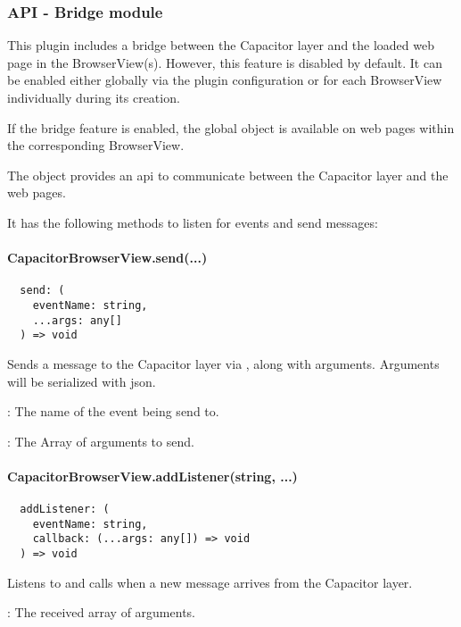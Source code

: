 \subsubsection{API - Bridge module}
\label{sec:Capacitor-BrowserView:API_BridgeModule}

This plugin includes a bridge between the Capacitor layer and the loaded web page in the BrowserView(s).
However, this feature is disabled by default.
It can be enabled either globally via the plugin configuration or for each BrowserView individually during its creation.

If the bridge feature is enabled, the global object  is available on web pages within the corresponding BrowserView.

The  object provides an \ac{api} to communicate between the Capacitor layer and the web pages.

It has the following methods to listen for events and send messages:

\begin{arguments}
  \item {}
  \item {}
\end{arguments}


\paragraph{CapacitorBrowserView.send(...)}

\begin{verbatim}
  send: (
    eventName: string,
    ...args: any[]
  ) => void
\end{verbatim}

Sends a message to the Capacitor layer via , along with arguments.
Arguments will be serialized with \ac{json}.

\begin{arguments}
  \item {}: The name of the event being send to.
  \item {}: The Array of arguments to send.
\end{arguments}


\paragraph{CapacitorBrowserView.addListener(string, ...)}

\begin{verbatim}
  addListener: (
    eventName: string,
    callback: (...args: any[]) => void
  ) => void
\end{verbatim}

Listens to  and calls  when a new message arrives from the Capacitor layer.

\begin{arguments}
  \item {}: The received array of arguments.
\end{arguments}
